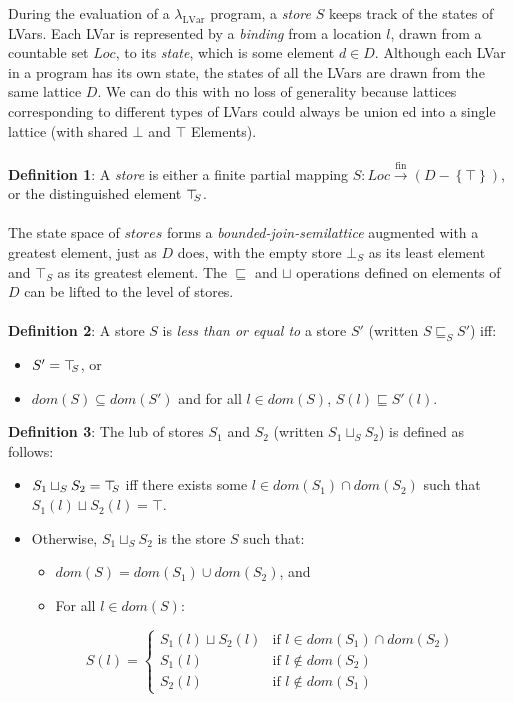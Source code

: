 \documentclass[twocolumn]{article}
\newcommand{\lambdaLVar}{\ensuremath{\lambda_{\textrm{LVar}}}}
\newcommand{\userleq}{\ensuremath{\sqsubseteq}}
\newcommand{\Loc}{\mathit{Loc}}
\newcommand{\fmap}{\ensuremath{\stackrel{\textrm{fin}}{\rightarrow}}}
\newcommand{\setof}[1]{\left\{#1\right\}}
\newcommand{\topS}{\ensuremath{\top\hspace{-0.85mm}_{S}}}
\newcommand{\leqstore}[2]{\ensuremath{#1 \userleq_S #2}}
\newcommand{\dom}[1]{\ensuremath{\mathit{dom}(#1)}}
\newcommand{\userlub}[2]{\ensuremath{#1 \sqcup #2}}
\newcommand{\lubstore}[2]{\ensuremath{#1 \sqcup_{S} #2}}
\begin{document}
During the evaluation of a $\lambdaLVar$ program, a \emph{store} $S$ keeps track of the states of LVars. Each LVar is represented by a \emph{binding} from a location $l$, drawn from a countable set $\Loc$, to its \emph{state}, which is some element $d \in D$. Although each LVar in a program has its own state, the states of all the LVars are drawn from the same lattice $D$. We can do this with no loss of generality because lattices corresponding to different types of LVars could always be union ed into a single lattice (with shared $\bot$ and $\top$ Elements). \\ \\
\textbf{Definition 1}: A \emph{store} is either a finite partial mapping $S : \Loc \fmap (D - \setof{\top})$, or the distinguished element $\topS$. \\ \\
The state space of $stores$ forms a \emph{bounded-join-semilattice} augmented with a greatest element, just as $D$ does, with the empty store $\bot_S$ as its least element and $\top_S$ as its greatest element. The $\userleq$ and $\sqcup$ operations defined on elements of $D$ can be lifted to the level of stores.\\ \\
\textbf{Definition 2}: 
 A store $S$ is \emph{less than or equal to} a store $S'$ (written
$\leqstore{S}{S'}$) iff:
\begin{itemize}
\item $S' = \topS$, or
\item $\dom{S} \subseteq \dom{S'}$ and for all $l
\in \dom{S}$, $S(l) \userleq S'(l)$.
\end{itemize}
\textbf{Definition 3}:  The lub of stores $S_1$ and $S_2$ (written $\lubstore{S_1}{S_2}$) is
defined as follows:
\begin{itemize}
\item $\lubstore{S_1}{S_2} = \topS$ iff there exists some $l \in
\dom{S_1} \cap \dom{S_2}$ such that $\userlub{S_1(l)}{S_2(l)} = \top$.
\item Otherwise, $\lubstore{S_1}{S_2}$ is the store $S$ such that:
\begin{itemize}
\item $\dom{S} = \dom{S_1} \cup \dom{S_2}$, and
\item For all $l \in \dom{S}$:
\end{itemize}
\begin{displaymath}
S(l) = \left\{ \begin{array}{ll}
\userlub{S_1(l)}{S_2(l)} & \textrm{if $l \in \dom{S_1} \cap \dom{S_2}$} \\
S_1(l) & \textrm{if $l \notin \dom{S_2}$} \\
S_2(l) & \textrm{if $l \notin \dom{S_1}$}
\end{array} \right.
\end{displaymath}
\end{itemize}
\end{document}
